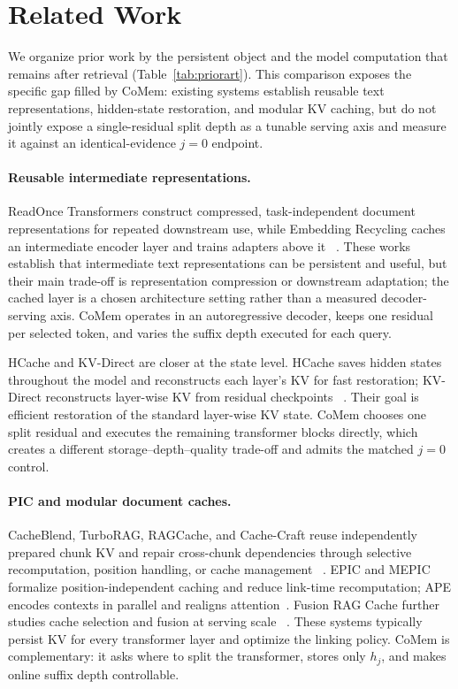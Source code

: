 \section{Related Work}
\label{sec:related}

We organize prior work by the persistent object and the model computation that
remains after retrieval (Table~\ref{tab:priorart}). This comparison exposes the
specific gap filled by CoMem: existing systems establish reusable text
representations, hidden-state restoration, and modular KV caching, but do not
jointly expose a single-residual split depth as a tunable serving axis and
measure it against an identical-evidence $j{=}0$ endpoint.



\paragraph{Reusable intermediate representations.}
ReadOnce Transformers construct compressed, task-independent document
representations for repeated downstream use, while Embedding Recycling caches
an intermediate encoder layer and trains adapters above it
~\citep{readonce,embeddingrecycling}. These works establish that intermediate
text representations can be persistent and useful, but their main trade-off is
representation compression or downstream adaptation; the cached layer is a
chosen architecture setting rather than a measured decoder-serving axis.
CoMem operates in an autoregressive decoder, keeps one residual per selected
token, and varies the suffix depth executed for each query.

HCache and KV-Direct are closer at the state level. HCache saves hidden states
throughout the model and reconstructs each layer's KV for fast restoration;
KV-Direct reconstructs layer-wise KV from residual checkpoints
~\citep{hcache,kvdirect}. Their goal is efficient restoration of the standard
layer-wise KV state. CoMem chooses one split residual and executes the remaining
transformer blocks directly, which creates a different storage--depth--quality
trade-off and admits the matched $j{=}0$ control.

\paragraph{PIC and modular document caches.}
CacheBlend, TurboRAG, RAGCache, and Cache-Craft reuse independently prepared
chunk KV and repair cross-chunk dependencies through selective recomputation,
position handling, or cache management
~\citep{cacheblend,turborag,ragcache,cachecraft}. EPIC and MEPIC formalize
position-independent caching and reduce link-time recomputation; APE encodes
contexts in parallel and realigns attention~\citep{epic,mepic,ape}. Fusion RAG
Cache further studies cache selection and fusion at serving scale
~\citep{fusionrag}. These systems typically persist KV for every transformer
layer and optimize the linking policy. CoMem is complementary: it asks where to
split the transformer, stores only $h_j$, and makes online suffix depth
controllable.

